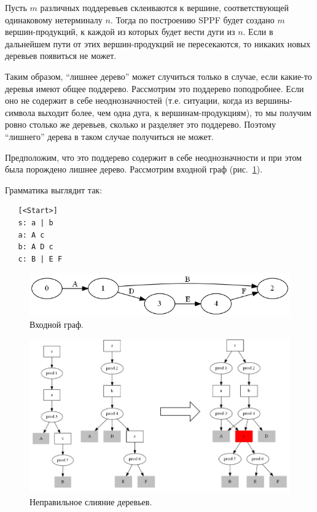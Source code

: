 Пусть $m$ различных поддеревьев склеиваются к вершине, соответствующей одинаковому нетерминалу $n$. Тогда по построению SPPF будет создано $m$ вершин-продукций, к каждой из которых будет вести дуги из $n$. Если в дальнейшем пути от этих вершин-продукций не пересекаются, то никаких новых деревьев появиться не может. 

Таким образом, ``лишнее дерево'' может случиться только в случае, если какие-то деревья имеют общее поддерево. Рассмотрим это поддерево поподробнее. Если оно не содержит в себе неоднозначностей (т.е. ситуации, когда из вершины-символа выходит более, чем одна дуга, к вершинам-продукциям), то мы получим ровно столько же деревьев, сколько и разделяет это поддерево. Поэтому ``лишнего'' дерева в таком случае получиться не может. 

Предположим, что это поддерево содержит в себе неоднозначности и при этом была порождено лишнее дерево. Рассмотрим входной граф (рис.~\ref{sppf_proof_input}). 

Грамматика выглядит так:

\begin{verbatim}
   [<Start>]
   s: a | b
   a: A c
   b: A D c
   c: B | E F
\end{verbatim}

\begin{figure}[t]
\centering
\includegraphics[width=\linewidth]{Ivanov/Pictures/proof_input.png}
\caption{Входной граф.}
\label{sppf_proof_input}
\end{figure}

\begin{figure}[t]
\centering
\includegraphics[width=\linewidth]{Ivanov/Pictures/proof_incorrect_merge.png}
\caption{Неправильное слияние деревьев.}
\label{sppf_proof_incorrect}
\end{figure}

